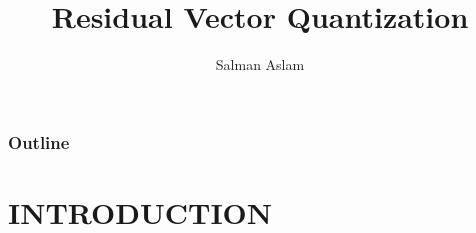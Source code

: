 

\title{Residual Vector Quantization}
\begin{frame}\logoTechTower
	\author{Salman Aslam}
	\titlepage
\end{frame}

\begin{frame}
\frametitle{Outline}
\logoTechTower\logoCSIPCPL
	\setcounter{tocdepth}{1}	
	\tableofcontents
\end{frame}


\section{INTRODUCTION}
